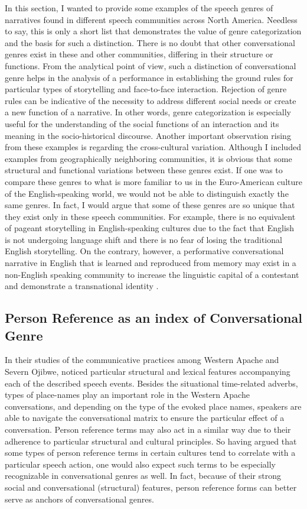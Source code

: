 \documentclass[12pt, draft]{article}
\begin{document}
In this section, I wanted to provide some examples of the speech genres of narratives found in different speech communities across North America. Needless to say, this is only a short list that demonstrates the value of genre categorization and the basis for such a distinction. There is no doubt that other conversational genres exist in these and other communities, differing in their structure or functions. From the analytical point of view, such a distinction of conversational genre helps in the analysis of a performance in establishing the ground rules for particular types of storytelling and face-to-face interaction. Rejection of genre rules can be indicative of the necessity to address different social needs or create a new function of a narrative. In other words, genre categorization is especially useful for the understanding of the social functions of an interaction and its meaning in the socio-historical discourse. Another important observation rising from these examples is regarding the cross-cultural variation. Although I included examples from geographically neighboring communities, it is obvious that some structural and functional variations between these genres exist. If one was to compare these genres to what is more familiar to us in the Euro-American culture of the English-speaking world, we would not be able to distinguish exactly the same genres. In fact, I would argue that some of these genres are so unique that they exist only in these speech communities. For example, there is no equivalent of pageant storytelling in English-speaking cultures due to the fact that English is not undergoing language shift and there is no fear of losing the traditional English storytelling. On the contrary, however, a performative conversational narrative in English that is learned and reproduced from memory may exist in a non-English speaking community to increase the linguistic capital of a contestant and demonstrate a transnational identity \parencite{billings2009}. 
\subsection{Person Reference as an index of Conversational Genre}
In their studies of the communicative practices among Western Apache and Severn Ojibwe, \textcite{basso1996,basso1990,valentine1995,samuels2004} noticed particular structural and lexical features accompanying each of the described speech events. Besides the situational time-related adverbs, types of place-names play an important role in the Western Apache conversations, and depending on the type of the evoked place names, speakers are able to navigate the conversational matrix to ensure the particular effect of a conversation. Person reference terms may also act in a similar way due to their adherence to particular structural and cultural principles. So having argued that some types of person reference terms in certain cultures tend to correlate with a particular speech action, one would also expect such terms to be especially recognizable in conversational genres as well. In fact, because of their strong social and conversational (structural) features, person reference forms can better serve as anchors of conversational genres.
\end{document}
